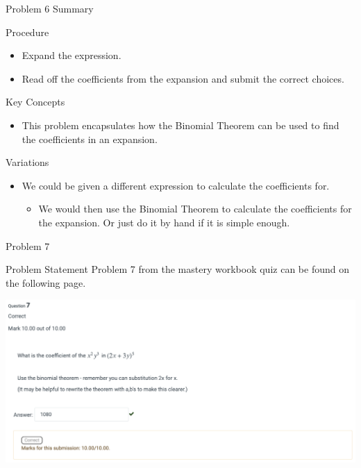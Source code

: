 \begin{summary}{Problem 6 Summary}
    \begin{statement}{Procedure}
        \begin{itemize}
            \item Expand the expression.
            \item Read off the coefficients from the expansion and submit the correct choices.
        \end{itemize}
    \end{statement}
    \begin{statement}{Key Concepts}
        \begin{itemize}
            \item This problem encapsulates how the Binomial Theorem can be used to find the coefficients in an expansion.
        \end{itemize}
    \end{statement}
    \begin{statement}{Variations}
        \begin{itemize}
            \item We could be given a different expression to calculate the coefficients for.
            \begin{itemize}
                \item We would then use the Binomial Theorem to calculate the coefficients for the expansion. Or just do it by hand if it is simple enough.
            \end{itemize}
        \end{itemize}
    \end{statement}
\end{summary}

\begin{problem}{Problem 7}
    \begin{statement}{Problem Statement}
        Problem 7 from the mastery workbook quiz can be found on the following page.
    \end{statement}
    \begin{highlight}[Solution]
        \begin{center}
            \includegraphics[width = 1.0\textwidth]{Images/Problem 7.png}
        \end{center}
    \end{highlight}
\end{problem}

